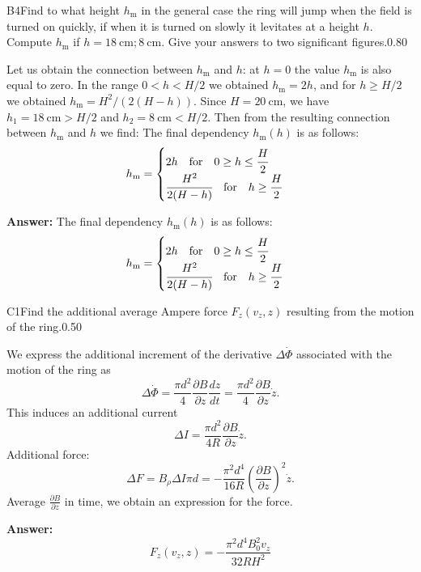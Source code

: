\documentclass[11pt,a4paper]{article}
\begin{document}
\begin{solcard}{B4}{Find to what height $h_\mathrm m$ in the general case the ring will jump when the field is turned on quickly, if when it is turned on slowly it levitates at a height $h$. Compute $h_\mathrm m$ if $h=18~\text{cm};8~\text{cm}$. Give your answers to two significant figures.}{0.80}

Let us obtain the connection between $h_\mathrm{m}$ and $h$: at $h=0$ the value $h_\mathrm{m}$ is also equal to zero. In the range $0 < h < H/2$ we obtained $h_\mathrm{m} = 2h$, and for $h \geq H/2$ we obtained $h_\mathrm{m} = H^2 / (2(H-h))$. Since $H = 20~\text{cm}$, we have $h_1 = 18~\text{cm} > H/2$ and $h_2 = 8~\text{cm} < H/2$. Then from the resulting connection between $h_\mathrm{m}$ and $h$ we find: The final dependency $h_\mathrm m(h)$ is as follows: $$h_\mathrm m=\begin{cases} 2h\quad\text{for}\quad 0\geq h\leq \cfrac{H}{2}\\ \cfrac{H^2}{2(H-h)}\quad\text{for}\quad h\geq\cfrac{H}{2} \end{cases} $$

\par\smallskip\noindent\textbf{Answer:} The final dependency $h_\mathrm m(h)$ is as follows: $$h_\mathrm m=\begin{cases} 2h\quad\text{for}\quad 0\geq h\leq \cfrac{H}{2}\\ \cfrac{H^2}{2(H-h)}\quad\text{for}\quad h\geq\cfrac{H}{2} \end{cases} $$
\end{solcard}

\begin{solcard}{C1}{Find the additional average Ampere force $F_z(v_z,z)$ resulting from the motion of the ring.}{0.50}

We express the additional increment of the derivative $\Delta \dot{\Phi}$ associated with the motion of the ring as $$ \Delta \dot{\Phi} = \frac{\pi d^2}{4}\frac{\partial B}{\partial z}\frac{dz}{dt} =  \frac{\pi d^2}{4}\frac{\partial B}{\partial z} \dot{z}. $$This induces an additional current $$ \Delta I = \frac{\pi d^2}{4R}\frac{\partial B}{\partial z} \dot{z}. $$Additional force: $$ \Delta F = B_{\rho} \Delta I \pi d = -\frac{\pi^2 d^4}{16R}\left(\frac{\partial B}{\partial z}\right)^2 \dot{z}. $$Average $\frac{\partial B}{\partial z}$ in time, we obtain an expression for the force.

\par\smallskip\noindent\textbf{Answer:} \[F_z(v_z,z)=-\frac{\pi^2d^4B_0^2v_z}{32 RH^2}\]
\end{solcard}
\end{document}
